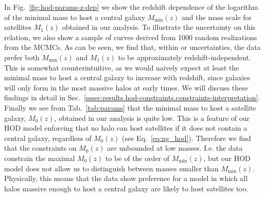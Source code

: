 \documentclass[a4paper,11pt]{article}
\begin{document}
      In Fig.~\ref{fig:hod-params-z-dep} we show the redshift dependence of the logarithm of the minimal mass to host a central galaxy $M_{\mathrm{min}}(z)$ and the mass scale for satellites $M_{1}(z)$ obtained in our analysis. To illustrate the uncertainty on this relation, we also show a sample of curves derived from 1000 random realizations from the MCMCs. As can be seen, we find that, within or uncertainties, the data prefer both $M_{\mathrm{min}}(z)$ and $M_{1}(z)$ to be approximately redshift-independent. This is somewhat counterintuitive, as we would naively expect at least the minimal mass to host a central galaxy to increase with redshift, since galaxies will only form in the most massive halos at early times. We will discuss these findings in detail in Sec.~\ref{sssec:results.hod-constraints.constraints-interpretation}. Finally we see from Tab.~\ref{tab:params} that the minimal mass to host a satellite galaxy, $M_{0}(z)$, obtained in our analysis is quite low. This is a feature of our HOD model enforcing that no halo can host satellites if it does not contain a central galaxy, regardless of $M_{0}(z)$ (see Eq.~\ref{eq:ng_hod}). Therefore we find that the constraints on $M_{0}(z)$ are unbounded at low masses. I.e. the data constrain the maximal $M_{0}(z)$ to be of the order of $M_{\mathrm{min}}(z)$, but our HOD model does not allow us to distinguish between masses smaller than $M_{\mathrm{min}}(z)$. Physically, this means that the data show preference for a model in which all halos massive enough to host a central galaxy are likely to host satellites too.
\end{document}
